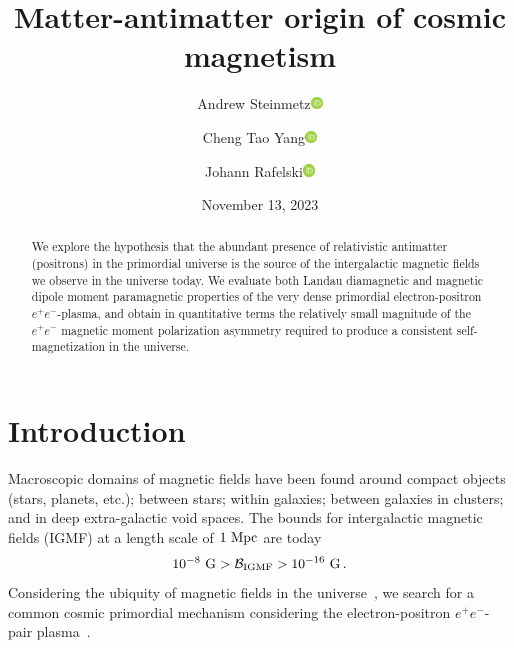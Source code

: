 \documentclass[aps,prd,floatfix,reprint]{revtex4-2}
\newcommand{\orcidicon}{\includegraphics[width=0.32cm]{orcid.pdf}}
\newcommand{\orc}[1]{\href{https://orcid.org/#1}{\orcidicon}}
\newcommand{\orcA}{0000-0001-8217-1484}
\newcommand{\orcB}{0000-0001-5038-8427}
\newcommand{\orcC}{0000-0001-5474-2649}
\begin{document}
\title{Matter-antimatter origin of cosmic magnetism}
\author{Andrew Steinmetz\orc{\orcC}}
\author{Cheng Tao Yang\orc{\orcB}}
\author{Johann Rafelski\orc{\orcA}}

\date{November 13, 2023}

\begin{abstract}
We explore the hypothesis that the abundant presence of relativistic antimatter (positrons) in the primordial universe is the source of the intergalactic magnetic fields we observe in the universe today. We evaluate both Landau diamagnetic and magnetic dipole moment paramagnetic properties of the very dense primordial electron-positron $e^{+}e^{-}$-plasma, and obtain in quantitative terms the relatively small magnitude of the $e^{+}e^{-}$ magnetic moment polarization asymmetry required to produce a consistent self-magnetization in the universe.
\end{abstract}


\maketitle

\section{Introduction}
\label{sec:introduction}
\noindent Macroscopic domains of magnetic fields have been found around compact objects (stars, planets, etc.); between stars; within galaxies; between galaxies in clusters; and in deep extra-galactic void spaces. The bounds for intergalactic magnetic fields (IGMF)  at a length scale of $1{\rm\ Mpc}$ are today~\cite{Neronov:2010gir,Taylor:2011bn,Pshirkov:2015tua,Jedamzik:2018itu,Vernstrom:2021hru}
\begin{align}
 \label{igmf}
 10^{-8}{\rm\ G}>\mathcal{B}_{\rm IGMF}>10^{-16}{\rm\ G}\,.
\end{align}
Considering the ubiquity of magnetic fields in the universe~\cite{Giovannini:2017rbc,Giovannini:2003yn,Kronberg:1993vk}, we search for a common cosmic primordial mechanism considering the electron-positron $e^{+}e^{-}$-pair plasma~\cite{Rafelski:2023emw,Grayson:2023flr}.
\end{document}
